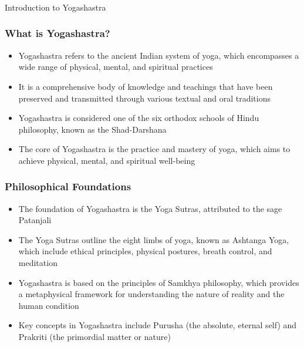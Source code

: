 \begin{frame}[fragile]\frametitle{}
\begin{center}
{\Large Introduction to Yogashastra}
\end{center}
\end{frame}

\begin{frame}[fragile]\frametitle{What is Yogashastra?}
    \begin{itemize}
        \item Yogashastra refers to the ancient Indian system of yoga, which encompasses a wide range of physical, mental, and spiritual practices
        \item It is a comprehensive body of knowledge and teachings that have been preserved and transmitted through various textual and oral traditions
        \item Yogashastra is considered one of the six orthodox schools of Hindu philosophy, known as the Shad-Darshana
        \item The core of Yogashastra is the practice and mastery of yoga, which aims to achieve physical, mental, and spiritual well-being
    \end{itemize}
\end{frame}

\begin{frame}[fragile]\frametitle{Philosophical Foundations}
    \begin{itemize}
        \item The foundation of Yogashastra is the Yoga Sutras, attributed to the sage Patanjali
        \item The Yoga Sutras outline the eight limbs of yoga, known as Ashtanga Yoga, which include ethical principles, physical postures, breath control, and meditation
        \item Yogashastra is based on the principles of Samkhya philosophy, which provides a metaphysical framework for understanding the nature of reality and the human condition
        \item Key concepts in Yogashastra include Purusha (the absolute, eternal self) and Prakriti (the primordial matter or nature)
    \end{itemize}
\end{frame}

